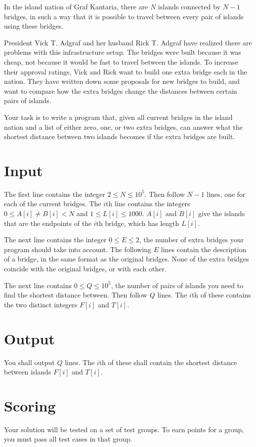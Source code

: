 \def\version{1}
In the island nation of Graf Kantaria, there are $N$ islands connected by $N - 1$ bridges, in such a way that it is possible to travel between every pair of islands using these bridges.

President Vick T. Adgraf and her husband Rick T. Adgraf have realized there are problems with this infrastructure setup.
The bridges were built because it was cheap, not because it would be fast to travel between the islands.
To increase their approval ratings, Vick and Rick want to build one extra bridge each in the nation.
They have written down some proposals for new bridges to build, and want to compare how the extra bridges change the distances between certain pairs of islands.

Your task is to write a program that, given all current bridges in the island nation and a list of either zero, one, or two extra bridges, can answer what the shortest distance between two islands becomes if the extra bridges are built.

\section*{Input}
The first line contains the integer $2 \le N \le 10^5$.
Then follow $N - 1$ lines, one for each of the current bridges.
The $i$th line contains the integers $0 \le A[i] \not= B[i] < N$ and $1 \le L[i] \le 1000$.
$A[i]$ and $B[i]$ give the islands that are the endpoints of the $i$th bridge, which has length $L[i]$.

The next line contains the integer $0 \le E \le 2$, the number of extra bridges your program should take into account.
The following $E$ lines contain the description of a bridge, in the same format as the original bridges.
None of the extra bridges coincide with the original bridges, or with each other.

The next line contains $0 \le Q \le 10^5$, the number of pairs of islands you need to find the shortest distance between.
Then follow $Q$ lines.
The $i$th of these contains the two distinct integers $F[i]$ and $T[i]$.

\section*{Output}
You shall output $Q$ lines.
The $i$th of these shall contain the shortest distance between islands $F[i]$ and $T[i]$.

\section*{Scoring}
Your solution will be tested on a set of test groups. To earn points for a group, you must pass all test cases in that group.

